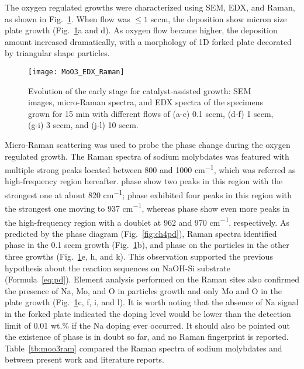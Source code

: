 The oxygen regulated growths were characterized using SEM, EDX, and Raman, as shown in Fig.~\ref{fig:ch4oxy}. When  flow was $\leq 1$ sccm, the deposition show micron size plate growth (Fig.~\ref{fig:ch4oxy}a and d). As oxygen flow became higher, the deposition amount increased dramatically, with a morphology of 1D forked plate decorated by triangular shape particles.
\begin{figure}[htb]
\centering
\texttt{[image: MoO3\_EDX\_Raman]}
\caption[Evolution of the early stage for catalyst-assisted  growth]{Evolution of the early stage for catalyst-assisted  growth: SEM images, micro-Raman spectra, and EDX spectra of the specimens grown for 15 min with different  flows of (a-c) 0.1 sccm, (d-f) 1 sccm, (g-i) 3 sccm, and (j-l) 10 sccm. }
\label{fig:ch4oxy}
\end{figure}
Micro-Raman scattering was used to probe the phase change during the oxygen regulated growth. The Raman spectra of sodium molybdates was featured with multiple strong peaks located between 800 and 1000 \si{cm^{-1}}, which was referred as high-frequency region hereafter.  phase show two peaks in this region with the strongest one at about 820 \si{cm^{-1}};  phase exhibited four peaks in this region with the strongest one moving to 937 \si{cm^{-1}}, whereas  phase show even more peaks in the high-frequency region with a doublet at 962 and 970 \si{cm^{-1}}, respectively.\cite{Schofield2005,Saraiva2011} As predicted by the phase diagram (Fig.~\ref{fig:ch4pd}), Raman spectra identified  phase in the 0.1 sccm growth (Fig.~\ref{fig:ch4oxy}b), and  phase on the particles in the other three growths (Fig.~\ref{fig:ch4oxy}e, h, and k). This observation supported the previous hypothesis about the reaction sequences on NaOH-Si substrate (Formula~\ref{eq:pd}). Element analysis performed on the Raman sites also confirmed the presence of Na, Mo, and O in particles growth and only Mo and O in the plate growth (Fig.~\ref{fig:ch4oxy}c, f, i, and l). It is worth noting that the absence of Na signal in the forked  plate indicated the doping level would be lower than the detection limit of 0.01 wt.\% if the Na doping ever occurred. It should also be pointed out the existence of  phase is in doubt so far, and no Raman fingerprint is reported.\cite{Fomichev1992} Table~\ref{tb:moo3ram} compared the Raman spectra of sodium molybdates and  between present work and literature reports.
